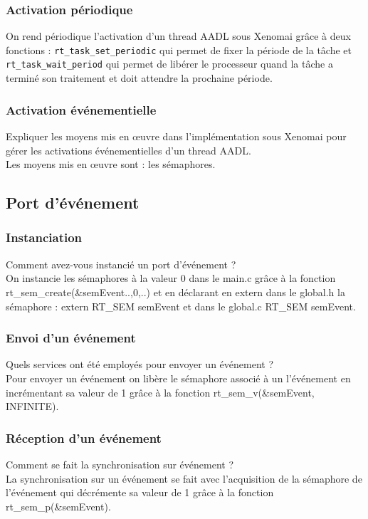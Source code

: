 \documentclass[11pt, a4paper]{paper}
\begin{document}
\subsubsection{Activation périodique}
 {\color{black} On rend périodique l'activation d'un thread AADL sous Xenomai grâce à deux fonctions : {\tt rt\_task\_set\_periodic} qui permet de fixer la période de la tâche et {\tt rt\_task\_wait\_period} qui permet de libérer le processeur quand la tâche a terminé son traitement et doit attendre la prochaine période.}

\subsubsection{Activation événementielle}
 {\color{blue} Expliquer les moyens mis en {\oe}uvre dans l'implémentation sous Xenomai pour gérer les activations événementielles d'un thread AADL.}
\\Les moyens mis en {\oe}uvre sont : les sémaphores.

\subsection{Port d’événement}

\subsubsection{Instanciation}
 {\color{blue} Comment avez-vous instancié un port d'événement ?}
\\On instancie les sémaphores à la valeur 0 dans le main.c grâce à la fonction rt\_sem\_create(\&semEvent..,0,..) et en déclarant en extern dans le global.h la sémaphore : extern RT\_SEM semEvent et dans le global.c RT\_SEM semEvent.

\subsubsection{Envoi d’un événement}
 {\color{blue} Quels services ont été employés pour envoyer un événement ?}
\\Pour envoyer un événement on libère le sémaphore associé à un l'événement en incrémentant sa valeur de 1 grâce à la fonction rt\_sem\_v(\&semEvent, INFINITE). 

\subsubsection{Réception d’un événement}
 {\color{blue} Comment se fait la synchronisation sur événement ?}
\\La synchronisation sur un événement se fait avec l'acquisition de la sémaphore de l'événement qui décrémente sa valeur de 1 grâce à la fonction rt\_sem\_p(\&semEvent).
\end{document}
